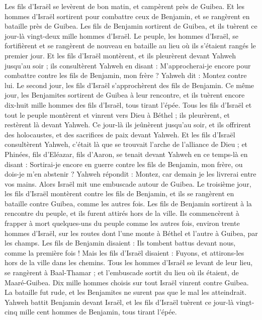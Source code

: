 \begin{multicols}{2}
Les fils d'Israël se levèrent de bon matin, et campèrent près de Guibea.
Et les hommes d'Israël sortirent pour combattre ceux de Benjamin, et se rangèrent en bataille près de Guibea.
Les fils de Benjamin sortirent de Guibea, et ils tuèrent ce jour-là vingt-deux mille hommes d'Israël.
Le peuple, les hommes d'Israël, se fortifièrent et se rangèrent de nouveau en bataille au lieu où ils s'étaient rangés le premier jour.
Et les fils d'Israël montèrent, et ils pleurèrent devant Yahweh jusqu'au soir ; ils consultèrent Yahweh en disant : M'approcherai-je encore pour combattre contre les fils de Benjamin, mon frère ? Yahweh dit : Montez contre lui.
Le second jour, les fils d'Israël s'approchèrent des fils de Benjamin.
Ce même jour, les Benjamites sortirent de Guibea à leur rencontre, et ils tuèrent encore dix-huit mille hommes des fils d'Israël, tous tirant l'épée.
Tous les fils d'Israël et tout le peuple montèrent et vinrent vers Dieu à Béthel ; ils pleurèrent, et restèrent là devant Yahweh. Ce jour-là ils jeûnèrent jusqu'au soir, et ils offrirent des holocaustes, et des sacrifices de paix devant Yahweh.
Et les fils d'Israël consultèrent Yahweh, c'était là que se trouvait l'arche de l'alliance de Dieu ;
et Phinées, fils d'Eléazar, fils d'Aaron, se tenait devant Yahweh en ce temps-là en disant : Sortirai-je encore en guerre contre les fils de Benjamin, mon frère, ou dois-je m'en abstenir ? Yahweh répondit : Montez, car demain je les livrerai entre vos mains.
Alors Israël mit une embuscade autour de Guibea.
Le troisième jour, les fils d'Israël montèrent contre les fils de Benjamin, et ils se rangèrent en bataille contre Guibea, comme les autres fois.
Les fils de Benjamin sortirent à la rencontre du peuple, et ils furent attirés hors de la ville. Ils commencèrent à frapper à mort quelques-uns du peuple comme les autres fois, environ trente hommes d'Israël, sur les routes dont l'une monte à Béthel et l'autre à Guibea, par les champs.
Les fils de Benjamin disaient : Ils tombent battus devant nous, comme la première fois ! Mais les fils d'Israël disaient : Fuyons, et attirons-les hors de la ville dans les chemins.
Tous les hommes d'Israël se levant de leur lieu, se rangèrent à Baal-Thamar ; et l'embuscade sortit du lieu où ils étaient, de Maaré-Guibea.
Dix mille hommes choisis sur tout Israël vinrent contre Guibea. La bataille fut rude, et les Benjamites ne surent pas que le mal les atteindrait.
Yahweh battit Benjamin devant Israël, et les fils d'Israël tuèrent ce jour-là vingt-cinq mille cent hommes de Benjamin, tous tirant l'épée.

\end{multicols}

